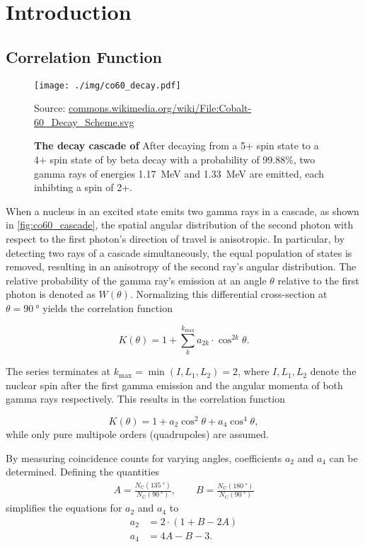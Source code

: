 \chapter{Introduction}

\section{Correlation Function}
\begin{figure}[tbp]
	\centering
	\texttt{[image: ./img/co60\_decay.pdf]}
	\caption*{Source: \url{commons.wikimedia.org/wiki/File:Cobalt-60_Decay_Scheme.svg}}
	\caption[The decay cascade of ]{\textbf{The decay cascade of } After decaying from a 5+ spin state to a 4+ spin state of  by beta decay with a probability of \num{99.88}\%, two gamma rays of energies \SI{1.17}{\MeV} and \SI{1.33}{\MeV} are emitted, each inhibting a spin of 2+.}
	\label{fig:co60_cascade}
\end{figure}
When a nucleus in an excited state emits two gamma rays in a cascade, as shown in \autoref{fig:co60_cascade}, the spatial angular distribution of the second photon with respect to the first photon's direction of travel is anisotropic.
In particular, by detecting two rays of a cascade simultaneously, the equal population of states is removed, resulting in an anisotropy of the second ray's angular distribution.	
The relative probability of the gamma ray's emission at an angle $\theta$ relative to the first photon is denoted as $W(\theta)$.
Normalizing this differential cross-section at $\theta=\SI{90}{\degree}$ yields the correlation function

\begin{equation*}
	K(\theta) = 1 + \sum_{k}^{k_\text{max}}a_{2k}\cdot\cos^{2k}{\theta}.
\end{equation*}

The series terminates at $k_\text{max}=\min(I, L_1, L_2)=2$, where $I, L_1, L_2$ denote the nuclear spin after the first gamma emission and the angular momenta of both gamma rays respectively.
This results in the correlation function

\begin{equation}\label{eq:corr_func}
	K(\theta) = 1 + a_2\cos^{2}{\theta} + a_4\cos^{4}{\theta},
\end{equation}
while only pure multipole orders (quadrupoles) are assumed.

By measuring coincidence counts for varying angles, coefficients $a_2$ and $a_4$ can be determined.
Defining the quantities 
\begin{gather*}
	A=\frac{N_\text{C}(\SI{135}{\degree})}{N_\text{C}(\SI{90}{\degree})},\qquad B=\frac{N_\text{C}(\SI{180}{\degree})}{N_\text{C}(\SI{90}{\degree})}
\end{gather*}
simplifies the equations for $a_2$ and $a_4$ to
\begin{align}
	a_2 &= 2\cdot(1+B-2A) \label{eq:a2}\\
	a_4 &= 4A-B-3. \label{eq:a4}
\end{align}

